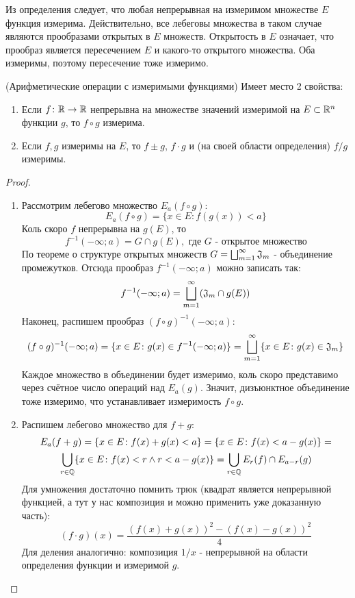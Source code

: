 \begin{note}
	Из определения следует, что любая непрерывная на измеримом множестве $E$ функция измерима. Действительно, все лебеговы множества в таком случае являются прообразами открытых в $E$ множеств. Открытость в $E$ означает, что прообраз является пересечением $E$ и какого-то открытого множества. Оба измеримы, поэтому пересечение тоже измеримо.
\end{note}

\begin{theorem} (Арифметические операции с измеримыми функциями) \label{arithmMF}
	Имеет место 2 свойства:
	\begin{enumerate}
		\item Если $f \colon \mathbb{R} \to \mathbb{R}$ непрерывна на множестве значений измеримой на $E \subset \mathbb{R}^n$ функции $g$, то $f \circ g$ измерима.
		
		\item Если $f, g$ измеримы на $E$, то $f \pm g$, $f \cdot g$ и (на своей области определения) $f / g$ измеримы.
	\end{enumerate}
\end{theorem}

\begin{proof}~
	\begin{enumerate}
		\item Рассмотрим лебегово множество $E_a(f \circ g)$:
		\[
			E_a(f \circ g) = \{x \in E \colon f(g(x)) < a\}
		\]
		Коль скоро $f$ непрерывна на $g(E)$, то
		\[
			f^{-1}(-\infty; a) = G \cap g(E), \text{ где $G$ - открытое множество}
		\]
		По теореме о структуре открытых множеств $G = \bigsqcup_{m = 1}^\infty \mathfrak{J}_m$ - объединение промежутков. Отсюда прообраз $f^{-1}(-\infty; a)$ можно записать так:
		\[
			f^{-1}(-\infty; a) = \bigsqcup_{m = 1}^\infty (\mathfrak{J}_m \cap g(E))
		\]
		Наконец, распишем прообраз $(f \circ g)^{-1}(-\infty; a)$:
		\[
			(f \circ g)^{-1}(-\infty; a) = \{x \in E \colon g(x) \in f^{-1}(-\infty; a)\} = \bigsqcup_{m = 1}^\infty \{x \in E \colon g(x) \in \mathfrak{J}_m\}
		\]
		Каждое множество в объединении будет измеримо, коль скоро представимо через счётное число операций над $E_a(g)$. Значит, дизъюнктное объединение тоже измеримо, что устанавливает измеримость $f \circ g$.
		
		\item Распишем лебегово множество для $f + g$:
		\begin{multline*}
			E_a(f + g) = \{x \in E \colon f(x) + g(x) < a\} = \{x \in E \colon f(x) < a - g(x)\} =
			\\
			\bigcup_{r \in \mathbb{Q}} \{x \in E \colon f(x) < r \wedge r < a - g(x)\} = \bigcup_{r \in \mathbb{Q}} E_r(f) \cap E_{a - r}(g)
		\end{multline*}
		Для умножения достаточно помнить трюк (квадрат является непрерывной функцией, а тут у нас композиция и можно применить уже доказанную часть):
		\[
			(f \cdot g)(x) = \frac{(f(x) + g(x))^2 - (f(x) - g(x))^2}{4}
		\]
		Для деления аналогично: композиция $1 / x$ - непрерывной на области определения функции и измеримой $g$.
	\end{enumerate}
\end{proof}


